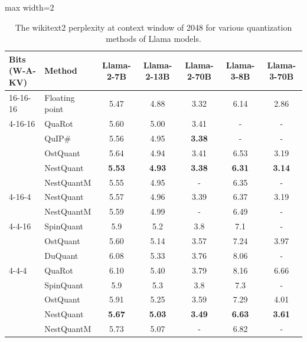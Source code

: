 \documentclass{article}
\theoremstyle{plain}
\theoremstyle{definition}
\theoremstyle{remark}
\begin{document}
\begin{table}[t]
\centering
\begin{adjustbox}{max width=2\columnwidth} %
\begin{threeparttable}
\begin{tabular}{llccccc}
    \toprule
    \textbf{Bits (W-A-KV)}& \textbf{Method}& \textbf{Llama-2-7B}& \textbf{Llama-2-13B}& \textbf{Llama-2-70B}& \textbf{Llama-3-8B}& \textbf{Llama-3-70B} \\
    \midrule
    16-16-16 & Floating point &5.47& 4.88& 3.32& 6.14& 2.86 \\
    \midrule
    4-16-16 & QuaRot      & 5.60 & 5.00 & 3.41 & -    & -    \\
            & QuIP\#      & 5.56 & 4.95 & \textbf{3.38} & -    & -    \\
            & OstQuant    & 5.64 & 4.94 & 3.41 & 6.53 & 3.19 \\
            & NestQuant   & \textbf{5.53} & \textbf{4.93} & \textbf{3.38} & \textbf{6.31} & \textbf{3.14} \\
            & NestQuantM  & 5.55 & 4.95 & -    & 6.35 & -    \\
    \midrule
    4-16-4  & NestQuant   & 5.57 & 4.96 & 3.39 & 6.37 & 3.19 \\
            & NestQuantM  & 5.59 & 4.99 & -    & 6.49 & -    \\
    \midrule
    4-4-16  & SpinQuant   & 5.9  & 5.2  & 3.8  & 7.1  & -    \\
            & OstQuant    & 5.60 & 5.14 & 3.57 & 7.24 & 3.97 \\
            & DuQuant     & 6.08 & 5.33 & 3.76 & 8.06  & -    \\
    \midrule
    4-4-4   & QuaRot      & 6.10 & 5.40 & 3.79 & 8.16 & 6.66 \\
            & SpinQuant   & 5.9  & 5.3  & 3.8  & 7.3  & -    \\
            & OstQuant    & 5.91 & 5.25 & 3.59 & 7.29 & 4.01 \\
            & NestQuant   & \textbf{5.67} & \textbf{5.03} & \textbf{3.49} & \textbf{6.63} & \textbf{3.61} \\
            & NestQuantM  & 5.73 & 5.07 & -    & 6.82 & -    \\
    \bottomrule
\end{tabular}

\end{threeparttable}
\end{adjustbox}

\caption{The wikitext2 perplexity at context window of 2048 for various quantization methods of Llama models.} 
\label{tab:llamas}
\end{table}
\end{document}

